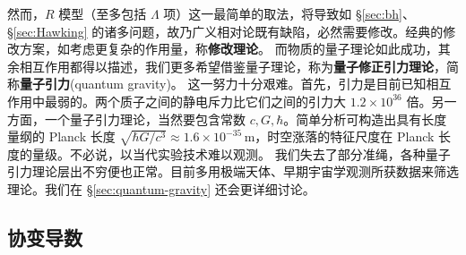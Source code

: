 然而，$R$ 模型（至多包括 $\Lambda$ 项）这一最简单的取法，将导致如 \S\ref{sec:bh}、\S\ref{sec:Hawking} 的诸多问题，故乃广义相对论既有缺陷，必然需要修改。经典的修改方案，如考虑更复杂的作用量，称\textbf{修改理论}。
而物质的量子理论如此成功，其余相互作用都得以描述，我们更多希望借鉴量子理论，称为\textbf{量子修正引力理论}，简称\textbf{量子引力}(quantum gravity)。
这一努力十分艰难。首先，引力是目前已知相互作用中最弱的。两个质子之间的静电斥力比它们之间的引力大 $1.2 \times 10^{36}$ 倍。另一方面，一个量子引力理论，当然要包含常数 $c,G,\hbar$。简单分析可构造出具有长度量纲的 Planck 长度 $\sqrt{\hbar G/c^3}\approx 1.6\times10^{-35}$\,m，时空涨落的特征尺度在 Planck 长度的量级。不必说，以当代实验技术难以观测。
我们失去了部分准绳，各种量子引力理论层出不穷便也正常。目前多用极端天体、早期宇宙学观测所获数据来筛选理论。我们在 \S\ref{sec:quantum-gravity} 还会更详细讨论。

\subsection{协变导数}

